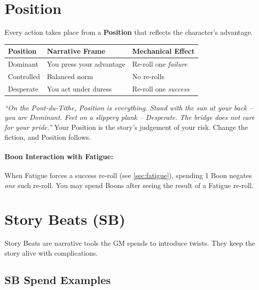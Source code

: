 \section{Position}
\label{sec:position}

Every action takes place from a \textbf{Position} that reflects the character’s advantage.

\begin{center}
\begin{tabular}{lll}
\toprule
\textbf{Position} & \textbf{Narrative Frame} & \textbf{Mechanical Effect} \\
\midrule
Dominant & You press your advantage & Re-roll one \textit{failure} \\
Controlled & Balanced norm & No re-rolls \\
Desperate & You act under duress & Re-roll one \textit{success} \\
\bottomrule
\end{tabular}
\end{center}

\begin{tcolorbox}[colback=blue!5!white,colframe=blue!75!black,title=A Vhasian Duelist’s Lesson]
\emph{“On the Pont‑du‑Tithe, Position is everything. Stand with the sun at your back – you are Dominant. Feet on a slippery plank – Desperate. The bridge does not care for your pride.”}  
Your Position is the story’s judgement of your risk. Change the fiction, and Position follows.
\end{tcolorbox}

\paragraph{Boon Interaction with Fatigue:} When Fatigue forces a success re-roll (see \ref{sec:fatigue}), spending 1 Boon negates \textit{one} such re-roll. You may spend Boons after seeing the result of a Fatigue re-roll.

\section{Story Beats (SB)}
\label{sec:story-beats}

Story Beats are narrative tools the GM spends to introduce twists. They keep the story alive with complications.

\subsection{SB Spend Examples}
\label{sec:sb-spend}

